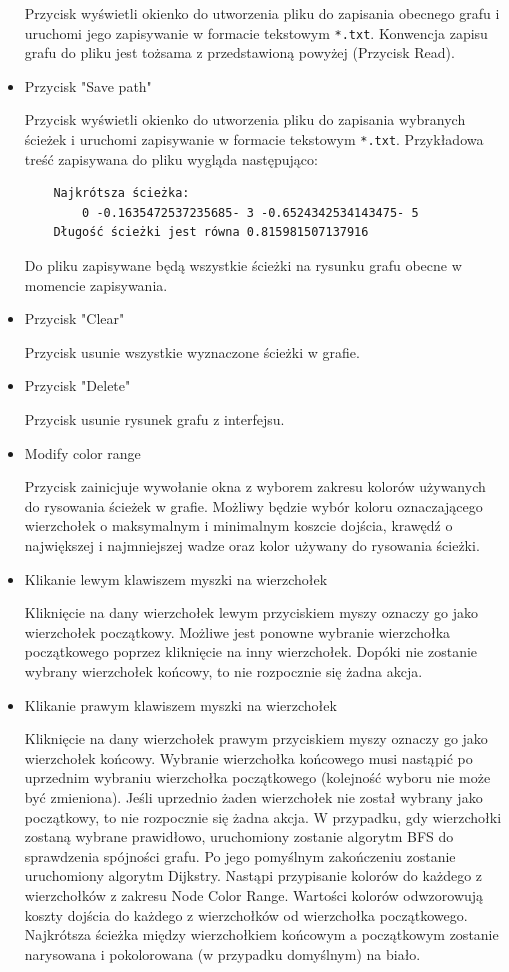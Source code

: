 \documentclass[]{article}
\begin{document}
\begin{itemize}
    Przycisk wyświetli okienko do utworzenia pliku do zapisania obecnego grafu i uruchomi jego zapisywanie w formacie tekstowym \texttt{*.txt}. Konwencja zapisu grafu do pliku jest tożsama z przedstawioną powyżej (Przycisk Read).
    \item Przycisk "Save path"
    
    Przycisk wyświetli okienko do utworzenia pliku do zapisania wybranych ścieżek i uruchomi zapisywanie w formacie tekstowym \texttt{*.txt}. Przykładowa treść zapisywana do pliku wygląda następująco:
    
    \begin{verbatim}
    Najkrótsza ścieżka:
        0 -0.1635472537235685- 3 -0.6524342534143475- 5
    Długość ścieżki jest równa 0.815981507137916
        \end{verbatim}
    Do pliku zapisywane będą wszystkie ścieżki na rysunku grafu obecne w momencie zapisywania. 
    \item Przycisk "Clear"
    
    Przycisk usunie wszystkie wyznaczone ścieżki w grafie.
    \item Przycisk "Delete"
    
    Przycisk usunie rysunek grafu z interfejsu.
    \item Modify color range
    
    Przycisk zainicjuje wywołanie okna z wyborem zakresu kolorów używanych do rysowania ścieżek w grafie. Możliwy będzie wybór koloru oznaczającego wierzchołek o maksymalnym i minimalnym koszcie dojścia, krawędź o największej i najmniejszej wadze oraz kolor używany do rysowania ścieżki.
    \item Klikanie lewym klawiszem myszki na wierzchołek
    
    Kliknięcie na dany wierzchołek lewym przyciskiem myszy oznaczy go jako wierzchołek początkowy. Możliwe jest ponowne wybranie wierzchołka początkowego poprzez kliknięcie na inny wierzchołek. Dopóki nie zostanie wybrany wierzchołek końcowy, to nie rozpocznie się żadna akcja. 
    
    
    \item Klikanie prawym klawiszem myszki na wierzchołek
    
    Kliknięcie na dany wierzchołek prawym przyciskiem myszy oznaczy go jako wierzchołek końcowy. Wybranie wierzchołka końcowego musi nastąpić po uprzednim wybraniu wierzchołka początkowego (kolejność wyboru nie może być zmieniona). Jeśli uprzednio żaden wierzchołek nie został wybrany jako początkowy, to nie rozpocznie się żadna akcja. W przypadku, gdy wierzchołki zostaną wybrane prawidłowo, uruchomiony zostanie algorytm BFS do sprawdzenia spójności grafu. Po jego pomyślnym zakończeniu zostanie uruchomiony algorytm Dijkstry. Nastąpi przypisanie kolorów do każdego z wierzchołków z zakresu Node Color Range. Wartości kolorów odwzorowują koszty dojścia do każdego z wierzchołków od wierzchołka początkowego. Najkrótsza ścieżka między wierzchołkiem końcowym a początkowym zostanie narysowana i pokolorowana (w przypadku domyślnym) na biało.

\end{itemize}
\end{document}
